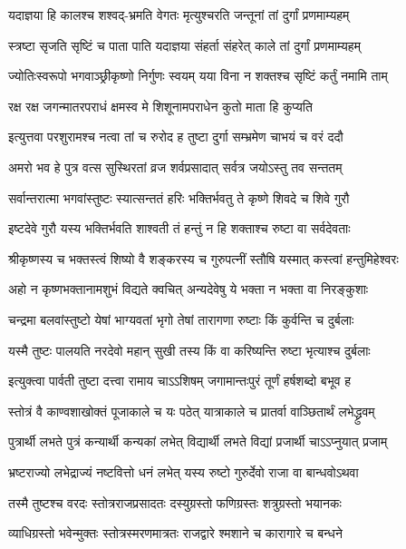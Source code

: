 \twolineshloka
{यदाज्ञया हि कालश्च शश्वद्-भ्रमति वेगतः}
{मृत्युश्चरति जन्तूनां तां दुर्गां प्रणमाम्यहम्}

\twolineshloka
{स्त्रष्टा सृजति सृष्टिं च पाता पाति यदाज्ञया}
{संहर्ता संहरेत् काले तां दुर्गां प्रणमाम्यहम्}

\twolineshloka
{ज्योतिःस्वरूपो भगवाञ्छ्रीकृष्णो निर्गुणः स्वयम्}
{यया विना न शक्तश्च सृष्टिं कर्तुं नमामि ताम्}

\twolineshloka
{रक्ष रक्ष जगन्मातरपराधं क्षमस्व मे}
{शिशूनामपराधेन कुतो माता हि कुप्यति}

\twolineshloka
{इत्युत्तवा परशुरामश्च नत्वा तां च रुरोद ह}
{तुष्टा दुर्गा सम्भ्रमेण चाभयं च वरं ददौ}

\twolineshloka
{अमरो भव हे पुत्र वत्स सुस्थिरतां व्रज}
{शर्वप्रसादात् सर्वत्र जयोऽस्तु तव सन्ततम्}


\twolineshloka
{सर्वान्तरात्मा भगवांस्तुष्टः स्यात्सन्ततं हरिः}
{भक्तिर्भवतु ते कृष्णे शिवदे च शिवे गुरौ}

\twolineshloka
{इष्टदेवे गुरौ यस्य भक्तिर्भवति शाश्वती}
{तं हन्तुं न हि शक्ताश्च रुष्टा वा सर्वदेवताः}

\twolineshloka
{श्रीकृष्णस्य च भक्तस्त्वं शिष्यो वै शङ्करस्य च}
{गुरुपत्‍‌नीं स्तौषि यस्मात् कस्त्वां हन्तुमिहेश्वरः}

\twolineshloka
{अहो न कृष्णभक्तानामशुभं विद्यते क्वचित्}
{अन्यदेवेषु ये भक्ता न भक्ता वा निरङ्कुशाः}

\twolineshloka
{चन्द्रमा बलवांस्तुष्टो येषां भाग्यवतां भृगो}
{तेषां तारागणा रुष्टाः किं कुर्वन्ति च दुर्बलाः}

\twolineshloka
{यस्मै तुष्टः पालयति नरदेवो महान् सुखी}
{तस्य किं वा करिष्यन्ति रुष्टा भृत्याश्च दुर्बलाः}

\twolineshloka
{इत्युक्त्वा पार्वती तुष्टा दत्त्‍‌वा रामाय चाऽऽशिषम्}
{जगामान्तःपुरं तूर्णं हर्षशब्दो बभूव ह}


\twolineshloka
{स्तोत्रं वै काण्वशाखोक्तं पूजाकाले च यः पठेत्}
{यात्राकाले च प्रातर्वा वाञ्छितार्थं लभेद्ध्रुवम्}

\twolineshloka
{पुत्रार्थी लभते पुत्रं कन्यार्थी कन्यकां लभेत्}
{विद्यार्थी लभते विद्यां प्रजार्थी चाऽऽप्नुयात् प्रजाम्}

\twolineshloka
{भ्रष्टराज्यो लभेद्राज्यं नष्टवित्तो धनं लभेत्}
{यस्य रुष्टो गुरुर्देवो राजा वा बान्धवोऽथवा}

\twolineshloka
{तस्मै तुष्टश्च वरदः स्तोत्रराजप्रसादतः}
{दस्युग्रस्तो फणिग्रस्तः शत्रुग्रस्तो भयानकः}

\twolineshloka
{व्याधिग्रस्तो भवेन्मुक्तः स्तोत्रस्मरणमात्रतः}
{राजद्वारे श्मशाने च कारागारे च बन्धने}

